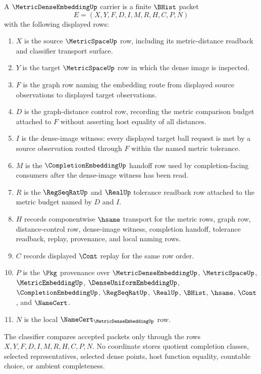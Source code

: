 \begin{definition}
\label{def:metric-dense-embedding-carrier}
A $\MetricDenseEmbeddingUp$ carrier is a finite $\BHist$ packet
$$
E=(X,Y,F,D,I,M,R,H,C,P,N)
$$
with the following displayed rows:
\begin{enumerate}
\item $X$ is the source $\MetricSpaceUp$ row, including its metric-distance readback and classifier transport surface.
\item $Y$ is the target $\MetricSpaceUp$ row in which the dense image is inspected.
\item $F$ is the graph row naming the embedding route from displayed source observations to displayed target observations.
\item $D$ is the graph-distance control row, recording the metric comparison budget attached to $F$ without asserting host equality of all distances.
\item $I$ is the dense-image witness: every displayed target ball request is met by a source observation routed through $F$ within the named metric tolerance.
\item $M$ is the $\CompletionEmbeddingUp$ handoff row used by completion-facing consumers after the dense-image witness has been read.
\item $R$ is the $\RegSeqRatUp$ and $\RealUp$ tolerance readback row attached to the metric budget named by $D$ and $I$.
\item $H$ records componentwise $\hsame$ transport for the metric rows, graph row, distance-control row, dense-image witness, completion handoff, tolerance readback, replay, provenance, and local naming rows.
\item $C$ records displayed $\Cont$ replay for the same row order.
\item $P$ is the $\Pkg$ provenance over $\MetricDenseEmbeddingUp$, $\MetricSpaceUp$, $\MetricEmbeddingUp$, $\DenseUniformEmbeddingUp$, $\CompletionEmbeddingUp$, $\RegSeqRatUp$, $\RealUp$, $\BHist$, $\hsame$, $\Cont$, and $\NameCert$.
\item $N$ is the local $\NameCert_{\MetricDenseEmbeddingUp}$ row.
\end{enumerate}
The classifier compares accepted packets only through the rows $X,Y,F,D,I,M,R,H,C,P,N$. No coordinate stores quotient completion classes, selected representatives, selected dense points, host function equality, countable choice, or ambient completeness.
\end{definition}

